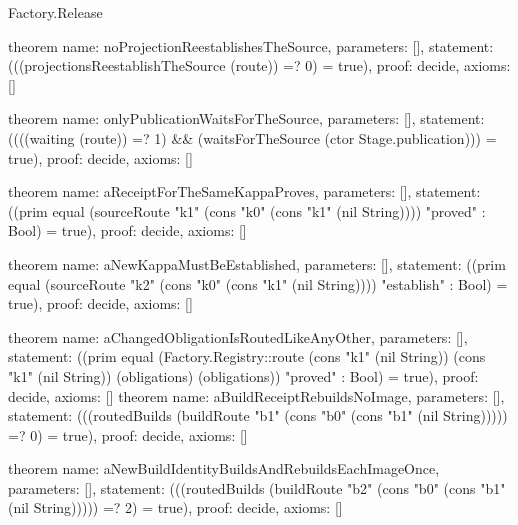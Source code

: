 \begin{lexlean}{Factory.Release}
\begin{semanticmodule}
theorem{
  name: noProjectionReestablishesTheSource,
  parameters: [],
  statement: (((projectionsReestablishTheSource (route)) =? 0) = true),
  proof: decide{},
  axioms: []
}

theorem{
  name: onlyPublicationWaitsForTheSource,
  parameters: [],
  statement: ((((waiting (route)) =? 1) && (waitsForTheSource (ctor Stage.publication))) = true),
  proof: decide{},
  axioms: []
}

theorem{
  name: aReceiptForTheSameKappaProves,
  parameters: [],
  statement: ((prim equal (sourceRoute "k1" (cons "k0" (cons "k1" (nil String)))) "proved" : Bool) = true),
  proof: decide{},
  axioms: []
}

theorem{
  name: aNewKappaMustBeEstablished,
  parameters: [],
  statement: ((prim equal (sourceRoute "k2" (cons "k0" (cons "k1" (nil String)))) "establish" : Bool) = true),
  proof: decide{},
  axioms: []
}

theorem{
  name: aChangedObligationIsRoutedLikeAnyOther,
  parameters: [],
  statement: ((prim equal (Factory.Registry::route (cons "k1" (nil String)) (cons "k1" (nil String)) (obligations) (obligations)) "proved" : Bool) = true),
  proof: decide{},
  axioms: []
}
theorem{
  name: aBuildReceiptRebuildsNoImage,
  parameters: [],
  statement: (((routedBuilds (buildRoute "b1" (cons "b0" (cons "b1" (nil String))))) =? 0) = true),
  proof: decide{},
  axioms: []
}

theorem{
  name: aNewBuildIdentityBuildsAndRebuildsEachImageOnce,
  parameters: [],
  statement: (((routedBuilds (buildRoute "b2" (cons "b0" (cons "b1" (nil String))))) =? 2) = true),
  proof: decide{},
  axioms: []
}
\end{semanticmodule}
\end{lexlean}
